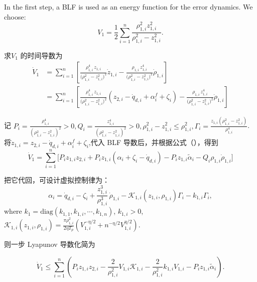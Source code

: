 \documentclass[pdflatex,sn-mathphys-num]{sn-jnl}%
\theoremstyle{thmstyleone}%
\theoremstyle{thmstyletwo}%
\theoremstyle{thmstylethree}%
\begin{document}
 
In the first step, a BLF is used as an energy function for the error dynamics. We choose:
\begin{equation}\label{eq:25}
	V_1= \frac{1}{2}\sum_{i=1}^{n} \frac{\rho_{1,i}^2 z_{1,i}^2}{\rho_{1,i}^2-z_{1,i}^2}. 
\end{equation}

求$V_1$ 的时间导数为
\begin{equation}\label{eq:25}
	\begin{aligned}
\dot V_1
&=\sum_{i=1}^{n}\left[
\frac{\rho_{1,i}^4\,z_{1,i}}{\big(\rho_{1,i}^{2}-z_{1,i}^{2}\big)^{2}}\dot z_{1,i}
-
\frac{\rho_{1,i}\,z_{1,i}^{4}}{\big(\rho_{1,i}^{2}-z_{1,i}^{2}\big)^{2}}\dot \rho_{1,i}
\right]\\
&=\sum_{i=1}^{n}\left[
\frac{\rho_{1,i}^4\,z_{1,i}}{\big(\rho_{1,i}^{2}-z_{1,i}^{2}\big)^{2}}(z_{2,i}-\dot q_{d,i}+\alpha^{f}_i+\zeta_i)-
\frac{\rho_{1,i}\,z_{1,i}^{4}}{\big(\rho_{1,i}^{2}-z_{1,i}^{2}\big)^{2}}\dot \rho_{1,i}
\right]
\end{aligned}
\end{equation}

记
$
P_{i}=\frac{\rho_{1,i}^4}{(\rho_{1,i}^2-z_{1,i}^2)^2}>0,
Q_{i}=\frac{ z_{1,i}^4}{(\rho_{1,i}^2-z_{1,i}^2)^2}>0,
 \rho_{1,i}^2 - z_{1,i}^2 \le \rho_{1,i}^2,
\varGamma_{i}=\frac{z_{1,i}\left(\rho_{1,i}^{2}-z_{1,i}^{2}\right)}{\rho_{1,i}^{4}}
$. 将$\dot z_{1,i}= z_{2,i}-\dot q_{d,i}+\alpha^{f}_i+\zeta_i$,代入 BLF 导数后，并根据公式（），得到
$$
\dot V_1=\sum_{i=1}^n\!\Big[P_{i} z_{1,i}z_{2,i}+P_{i}z_{1,i}(\alpha_i+\zeta_i-\dot q_{d,i})-P_{i}z_{1,i}\tilde\alpha_i-Q_{i}\rho_{1,i} \dot\rho_{1,i}\Big]
$$
 

把它代回，可设计虚拟控制律为：
\begin{equation}\label{eq:25}
\alpha_i = \dot q_{d,i}-\zeta_i+\frac{z_{1,i}^3}{\rho_{1,i}^3}\,\dot\rho_{1,i}
-\mathcal{K}_{1,i}(z_{1,i},\rho_{1,i})\varGamma_{i}
-k_{1,i} \varGamma_{i},
\end{equation}
where $k_1=\mathrm{diag}(k_{1,1},k_{1,i},\cdots,k_{1,n})$, $k_{1,i}>0$, $
\mathcal{K}_{1,i}(z_{1,i},\rho_{1,i})
=\frac{\pi \rho_{1,i}^2}{2\eta T_p}\left(V_{1,i}^{-\eta/2}+n^{-{\eta}/{2} }V_{1,i}^{\eta/2}\right)$.

则一步 Lyapunov 导数化简为

$$
\dot V_1
\le \sum_{i=1}^n \left( P_{i}z_{1,i} z_{2,i}-
\frac{2}{\rho_{1,i}^2} V_{1,i} \mathcal{K}_{1,i}- \frac{2}{\rho_{1,i}^2}k_{1,i}V_{1,i}-P_{i}z_{1,i}\tilde\alpha_i
\right).
$$
\end{document}
